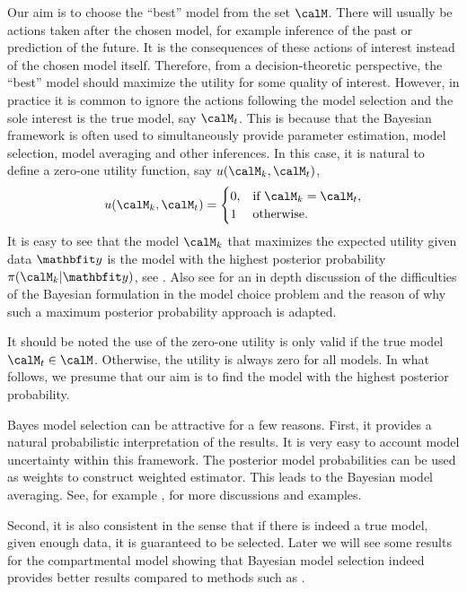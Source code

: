 Our aim is to choose the ``best'' model from the set $\calM$. There will
usually be actions taken after the chosen model, for example inference of the
past or prediction of the future. It is the consequences of these actions of
interest instead of the chosen model itself. Therefore, from a
decision-theoretic perspective, the ``best'' model should maximize the utility
for some quality of interest. However, in practice it is common to ignore the
actions following the model selection and the sole interest is the true model,
say $\calM_t$. This is because that the Bayesian framework is often used to
simultaneously provide parameter estimation, model selection, model averaging
and other inferences. In this case, it is natural to define a zero-one utility
function, say $u(\calM_k,\calM_t)$,
\begin{equation}
  u(\calM_k,\calM_t) =
  \begin{cases}
    0, &\text{if } \calM_k = \calM_t,\\
    1  &\text{otherwise.}
  \end{cases}
\end{equation}
It is easy to see that the model $\calM_k$ that maximizes the expected utility
given data $\data$ is the model with the highest posterior probability
$\pi(\calM_k|\data)$, see \cite[][chap.~6]{Bernardo:1994vd}. Also see
\cite[][sec.~7.2.1]{Robert:2007tc} for an in depth discussion of the
difficulties of the Bayesian formulation in the model choice problem and the
reason of why such a maximum posterior probability approach is adapted.

It should be noted the use of the zero-one utility is only valid if the true
model $\calM_t \in \calM$. Otherwise, the utility is always zero for all
models. In what follows, we presume that our aim is to find the model with the
highest posterior probability.

Bayes model selection can be attractive for a few reasons. First, it provides
a natural probabilistic interpretation of the results. It is very easy to
account model uncertainty within this framework. The posterior model
probabilities can be used as weights to construct weighted estimator. This
leads to the Bayesian model averaging. See, for example
\cite{Raftery:1997vx,Clyde:1999vx,Draper:1995vx}, for more discussions and
examples.

Second, it is also consistent in the sense that if there is indeed a true
model, given enough data, it is guaranteed to be selected. Later we will see
some results for the \pet compartmental model showing that Bayesian model
selection indeed provides better results compared to methods such as \aic.

